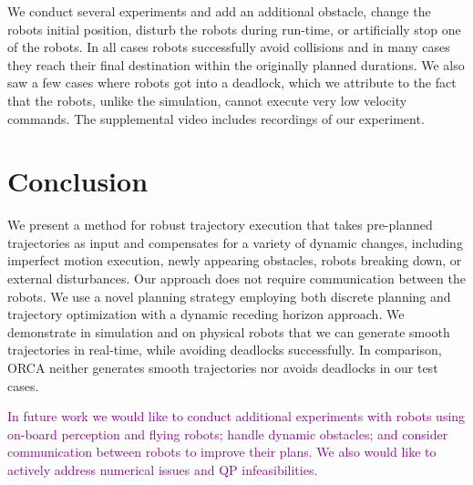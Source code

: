 \documentclass{svproc}
\newcommand{\todo}[1]{\textbf{\textcolor{red}{TODO: #1}}}
\newcommand{\changed}[1]{\textcolor{purple}{#1}}
\begin{document}
We conduct several experiments and add an additional obstacle, change the robots initial position, disturb the robots during run-time, or artificially stop one of the robots.
In all cases robots successfully avoid collisions and in many cases they reach their final destination within the originally planned durations.
We also saw a few cases where robots got into a deadlock, which we attribute to the fact that the robots, unlike the simulation, cannot execute very low velocity commands.
The supplemental video includes recordings of our experiment.




\section{Conclusion}

We present a method for robust trajectory execution that takes pre-planned trajectories as input and compensates for a variety of dynamic changes, including imperfect motion execution, newly appearing obstacles, robots breaking down, or external disturbances.
Our approach does not require communication between the robots.
We use a novel planning strategy employing both discrete planning and trajectory optimization with a dynamic receding horizon approach.
We demonstrate in simulation and on physical robots that we can generate smooth trajectories in real-time, while avoiding deadlocks successfully. In comparison, ORCA neither generates smooth trajectories nor avoids deadlocks in our test cases.

\changed{In future work we would like to conduct additional experiments with robots using on-board perception and flying robots; handle dynamic obstacles; and consider communication between robots to improve their plans. We also would like to actively address numerical issues and QP infeasibilities.}

\vfill


\pagebreak
\end{document}
